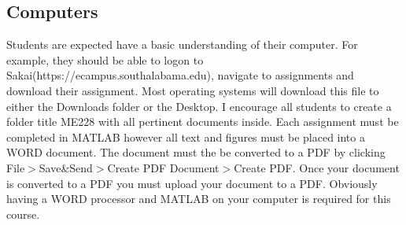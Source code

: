 \subsection{Computers}

Students are expected have a basic understanding of their
computer. For example, they should be able to logon to
Sakai(https://ecampus.southalabama.edu), navigate to assignments and
download their assignment. Most operating systems will download this
file to either the Downloads folder or the Desktop. I encourage all
students to create a folder title ME228 with all pertinent documents
inside. Each assignment must be completed in MATLAB however all text
and figures must be placed into a WORD document. The document must the
be converted to a PDF by clicking File$>$Save\&Send$>$Create PDF
Document$>$Create PDF. Once your document is converted to a PDF you
must upload your document to a PDF. Obviously having a WORD processor
and MATLAB on your computer is required for this course.\\

